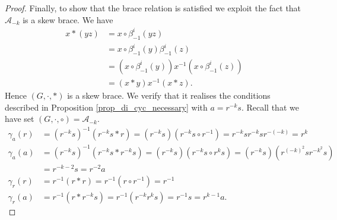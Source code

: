 \documentclass[10pt,a4paper]{amsart}
\begin{document}
\begin{proof}
Finally, to show that the brace relation is satisfied we exploit the fact that $ \mathscr{A}_{-k} $ is a skew brace. We have
\begin{align*}
x \ast (yz) &= x \circ \beta_{-1}^{i}(yz) \\
&= x \circ \beta_{-1}^{i}(y)\beta_{-1}^{i}(z) \\
&= (x \circ \beta_{-1}^{i}(y))x^{-1}(x \circ \beta_{-1}^{i}(z)) \\
&= (x \ast y)x^{-1}(x \ast z). 
\end{align*}
Hence $ (G,\cdot,\ast) $ is a skew brace. We verify that it realises the conditions described in Proposition \ref{prop_di_cyc_necessary} with $ a=r^{-k}s $. Recall that we have set $ (G,\cdot,\circ) = \mathscr{A}_{-k} $.
\begin{align*}
\gamma_{a}(r) &= (r^{-k}s)^{-1}(r^{-k}s \ast r) = (r^{-k}s)(r^{-k}s \circ r^{-1}) = r^{-k}s r^{-k} s r^{-(-k)} = r^{k} \\
%
\gamma_{a}(a) &= (r^{-k}s)^{-1}(r^{-k}s \ast r^{-k}s) = (r^{-k}s)(r^{-k}s \circ r^{k}s)= (r^{-k}s)(r^{(-k)^{2}}s r^{-k^{2}}s) \\
& = r^{-k-2}s = r^{-2} a \\
%
\gamma_{r}(r) &= r^{-1}(r \ast r) = r^{-1}(r \circ r^{-1}) = r^{-1} \\
%
\gamma_{r}(a) &= r^{-1}(r \ast r^{-k}s) = r^{-1}( r^{-k} r^{k}s ) = r^{-1}s = r^{k-1}a.
\end{align*}
\end{proof}
\end{document}
